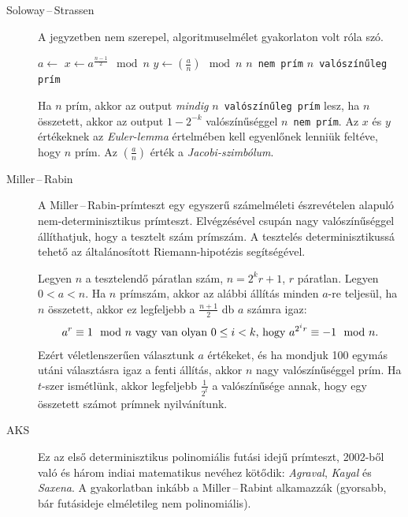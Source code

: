 \documentclass[DIV=15,appendixprefix]{scrreprt}
\theoremstyle{definition}
\theoremstyle{remark}
\begin{document}
\begin{description}
	\item[Soloway\,--\,Strassen] A jegyzetben nem szerepel, algoritmuselmélet gyakorlaton volt róla
		szó.
		\begin{algorithmic}[1]
				\State $ a \gets $ 
				\State $ x \gets a^{ \frac{ n - 1 }{ 2 } } \mod{ n }$
				\State $y \gets \left( \frac{ a }{ n }  \right) \mod{n}$
					\State \Return \texttt{$ n $ nem prím}
				\EndIf
			\EndFor
			\State \Return \texttt{$ n $ valószínűleg prím}
		\end{algorithmic}
		Ha $ n $ prím, akkor az output \emph{mindig} \texttt{$ n $ valószínűleg prím} lesz, ha $ n $
		összetett, akkor az output $ 1 - 2^{ - k } $ valószínűséggel \texttt{$ n $ nem prím}. Az
		$ x $ és $ y $ értékeknek az \emph{Euler-lemma} értelmében kell egyenlőnek lenniük feltéve,
		hogy $ n $ prím. Az $ \left( \frac{ a }{ n } \right) $ érték a \emph{Jacobi-szimbólum}.

	\item[Miller\,--\,Rabin] A Miller\,--\,Rabin-prímteszt egy egyszerű számelméleti észrevételen
		alapuló nem-determinisztikus prímteszt. Elvégzésével csupán nagy valószínűséggel
		állíthatjuk, hogy  a tesztelt szám prímszám. A tesztelés determinisztikussá tehető az
		általánosított Riemann-hipotézis segítségével.

		Legyen $ n $ a tesztelendő páratlan szám, $ n = 2^{ k } r + 1 $, $ r $ páratlan. Legyen
		$ 0 < a < n $. Ha $ n $ prímszám, akkor az alábbi állítás minden $ a $-re teljesül, ha $ n $
		összetett, akkor ez legfeljebb a $ \frac{ n+ 1 }{ 2 } $ db $ a $ számra igaz:
		\begin{equation*}
			a^{r}\equiv 1 \mod{n}\  \text{vagy van olyan $ 0 \le i < k $, hogy}\ a^{ 2^{ i } r }
			\equiv - 1 \mod{n}.
		\end{equation*}
		Ezért véletlenszerűen választunk $ a $ értékeket, és ha mondjuk 100 egymás utáni választásra
		igaz a fenti állítás, akkor $ n $ nagy valószínűséggel prím. Ha $ t $-szer ismétlünk, akkor
		legfeljebb $ \frac{ 1 }{ 2^{ t } } $ a valószínűsége annak, hogy egy összetett számot
		prímnek nyilvánítunk.
	\item[AKS] Ez az első determinisztikus polinomiális futási idejű prímteszt, 2002-ből való és
		három indiai matematikus nevéhez kötődik: \emph{Agraval}, \emph{Kayal} és \emph{Saxena}. A
		gyakorlatban inkább a Miller\,--\,Rabint alkamazzák (gyorsabb, bár futásideje elméletileg
		nem polinomiális).


\end{description}
\end{document}
